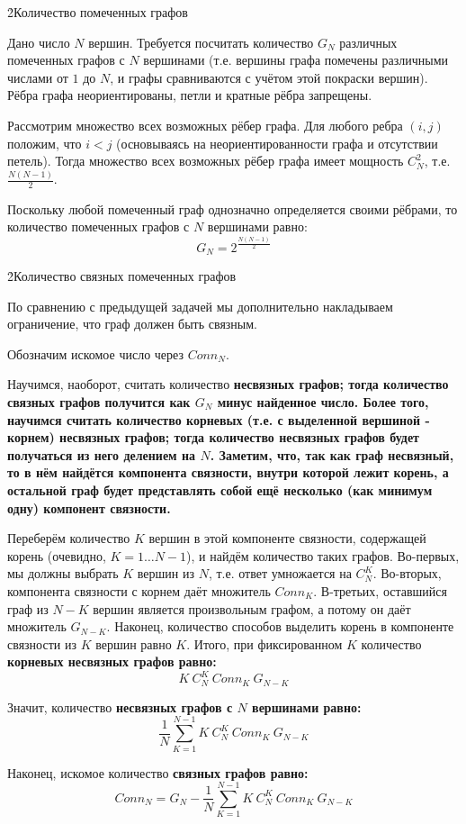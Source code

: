\h2{Количество помеченных графов}

Дано число $N$ вершин. Требуется посчитать количество $G_N$ различных помеченных графов с $N$ вершинами (т.е. вершины графа помечены различными числами от $1$ до $N$, и графы сравниваются с учётом этой покраски вершин). Рёбра графа неориентированы, петли и кратные рёбра запрещены.

Рассмотрим множество всех возможных рёбер графа. Для любого ребра $(i,j)$ положим, что $i<j$ (основываясь на неориентированности графа и отсутствии петель). Тогда множество всех возможных рёбер графа имеет мощность $C_N^2$, т.е. $\frac{ N (N-1) }{ 2 }$.

Поскольку любой помеченный граф однозначно определяется своими рёбрами, то количество помеченных графов с $N$ вершинами равно:
$$ G_N = 2^{ \frac{ N (N-1) }{ 2 } } $$

\h2{Количество связных помеченных графов}

По сравнению с предыдущей задачей мы дополнительно накладываем ограничение, что граф должен быть связным.

Обозначим искомое число через $Conn_N$.

Научимся, наоборот, считать количество \bf{несвязных} графов; тогда количество связных графов получится как $G_N$ минус найденное число. Более того, научимся считать количество \bf{корневых} (т.е. с выделенной вершиной - корнем) \bf{несвязных графов}; тогда количество несвязных графов будет получаться из него делением на $N$. Заметим, что, так как граф несвязный, то в нём найдётся компонента связности, внутри которой лежит корень, а остальной граф будет представлять собой ещё несколько (как минимум одну) компонент связности.

Переберём количество $K$ вершин в этой компоненте связности, содержащей корень (очевидно, $K = 1 \ldots N-1$), и найдём количество таких графов. Во-первых, мы должны выбрать $K$ вершин из $N$, т.е. ответ умножается на $C_N^K$. Во-вторых, компонента связности с корнем даёт множитель $Conn_K$. В-третьих, оставшийся граф из $N-K$ вершин является произвольным графом, а потому он даёт множитель $G_{N-K}$. Наконец, количество способов выделить корень в компоненте связности из $K$ вершин равно $K$. Итого, при фиксированном $K$ количество \bf{корневых несвязных} графов равно:
$$ K\ C_N^K\ Conn_K\ G_{N-K} $$

Значит, количество \bf{несвязных} графов с $N$ вершинами равно:
$$ \frac{1}{N} \sum_{K=1}^{N-1} K\ C_N^K\ Conn_K\ G_{N-K} $$

Наконец, искомое количество \bf{связных} графов равно:
$$ Conn_N = G_N - \frac{1}{N} \sum_{K=1}^{N-1} K\ C_N^K\ Conn_K\ G_{N-K} $$

